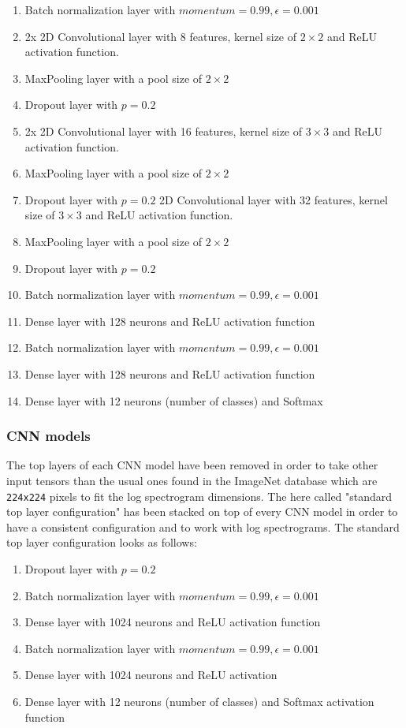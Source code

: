 \documentclass{article}
\theoremstyle{definition}
\theoremstyle{remark}
\begin{document}
\begin{enumerate}
		\item Batch normalization layer with $momentum=0.99, \epsilon=0.001$
		\item 2x 2D Convolutional layer with 8 features, kernel size of $2 \times 2$ and ReLU activation function.
		\item MaxPooling layer with a pool size of $2 \times 2$
		\item Dropout layer with $p = 0.2$
		\item 2x 2D Convolutional layer with 16 features, kernel size of $3 \times 3$ and ReLU activation function.
		\item MaxPooling layer with a pool size of $2 \times 2$
		\item Dropout layer with $p = 0.2$
		2D Convolutional layer with 32 features, kernel size of $3 \times 3$ and ReLU activation function.
			\item MaxPooling layer with a pool size of $2 \times 2$
			\item Dropout layer with $p = 0.2$
		\item Batch normalization layer with $momentum=0.99, \epsilon=0.001$
			\item Dense layer with 128 neurons and ReLU activation function
		\item Batch normalization layer with $momentum=0.99, \epsilon=0.001$
		\item Dense layer with 128 neurons and ReLU activation function
		\item Dense layer with 12 neurons (number of classes) and Softmax
		
\end{enumerate}


\subsubsection{CNN models} \label{cnn_models}

The top layers of each CNN model have been removed in order to take other input tensors than the usual ones found in the ImageNet database which are \texttt{224x224} pixels to fit the log spectrogram dimensions. The here called "standard top layer configuration" has been stacked on top of every CNN model in order to have a consistent configuration and to work with log spectrograms. The standard top layer configuration looks as follows:

\begin{enumerate}
	\item Dropout layer with $p = 0.2$
	\item Batch normalization layer with $momentum=0.99, \epsilon=0.001$
	\item Dense layer with 1024 neurons and ReLU activation function
	\item Batch normalization layer with $momentum=0.99, \epsilon=0.001$
	\item Dense layer with 1024 neurons and ReLU activation
	\item Dense layer with 12 neurons (number of classes) and Softmax activation function
\end{enumerate}
\end{document}
